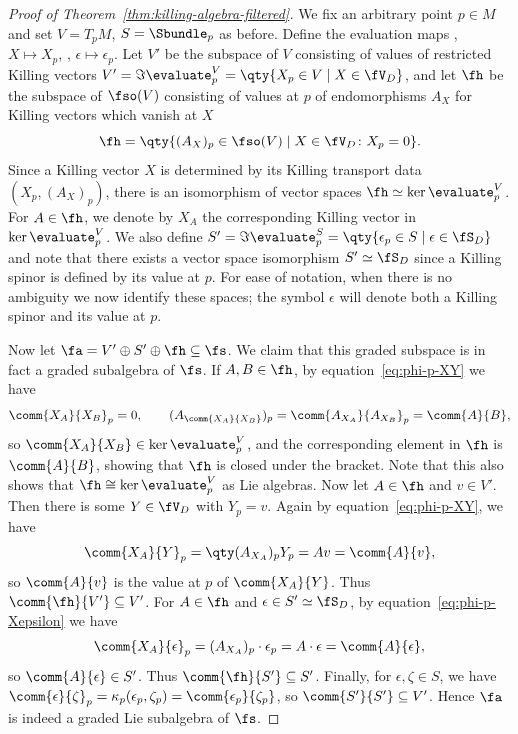 \begin{proof}[Proof of Theorem~\ref{thm:killing-algebra-filtered}]	
	We fix an arbitrary point $p\in M$ and set $V=T_pM$, $S=\Sbundle_p$ as before. Define the evaluation maps
, $X\mapsto X_p$,
, $\epsilon\mapsto \epsilon_p$.
	Let $V'$ be the subspace of $V$ consisting of values of restricted Killing vectors
$V' = \Im\evaluate^V_p = \qty{X_p\in V \mid X\in\fV_D }$,
	and let $\fh$ be the subspace of $\fso(V)$ consisting of values at $p$ of endomorphisms $A_X$ for Killing vectors which vanish at $X$
	\[
		\fh = \qty{(A_X)_p\in\fso(V) \mid X\in\fV_D\colon X_p=0}.
	\]
	Since a Killing vector $X$ is determined by its Killing transport data $(X_p,(A_X)_p)$, there is an isomorphism of vector spaces $\fh\simeq \ker\evaluate^V_p$. For $A\in\fh$, we denote by $X_A$ the corresponding Killing vector in $\ker\evaluate^V_p$. We also define
$S' = \Im\evaluate^S_p = \qty{\epsilon_p\in S \mid \epsilon\in\fS_D}
$
	and note that there exists a vector space isomorphism $S'\simeq \fS_D$ since a Killing spinor is defined by its value at $p$. For ease of notation, when there is no ambiguity we now identify these spaces; the symbol $\epsilon$ will denote both a Killing spinor and its value at $p$.
	
	Now let $\fa = V'\oplus S'\oplus\fh \subseteq \fs$. We claim that this graded subspace is in fact a graded subalgebra of $\fs$. If $A,B\in\fh$, by equation~\eqref{eq:phi-p-XY} we have
	\begin{gather*}
		\comm{X_A}{X_B}_p = 0,\qquad
		(A_{\comm{X_A}{X_B}})_p = \comm{A_{X_A}}{A_{X_B}}_p = \comm{A}{B},
	\end{gather*}
	so $\comm{X_A}{X_B}\in\ker\evaluate^V_p$, and the corresponding element in $\fh$ is $\comm{A}{B}$, showing that $\fh$ is closed under the bracket. Note that this also shows that $\fh\cong\ker\evaluate^V_p$ as Lie algebras. Now let $A\in\fh$ and $v\in V'$. Then there is some $Y\in\fV_D$ with $Y_p=v$. Again by equation~\eqref{eq:phi-p-XY}, we have
	\[
		\comm{X_A}{Y}_p = \qty(A_{X_A})_p Y_p = A v = \comm{A}{v},
	\]
	so $\comm{A}{v}$ is the value at $p$ of $\comm{X_A}{Y}$. Thus $\comm{\fh}{V'}\subseteq V'$. For $A\in\fh$ and $\epsilon\in S'\simeq\fS_D$, by equation~\eqref{eq:phi-p-Xepsilon} we have
	\[
		\comm{X_A}{\epsilon}_p = (A_{X_A})_p\cdot\epsilon_p = A\cdot\epsilon = \comm{A}{\epsilon},
	\]
	so $\comm{A}{\epsilon}\in S'$. Thus $\comm{\fh}{S'}\subseteq S'$. Finally, for $\epsilon,\zeta\in S$, we have
$\comm{\epsilon}{\zeta}_p
			= \kappa_p(\epsilon_p,\zeta_p)
			= \comm{\epsilon_p}{\zeta_p}$,
	so $\comm{S'}{S'}\subseteq V'$. Hence $\fa$ is indeed a graded Lie subalgebra of $\fs$.
	

\end{proof}
